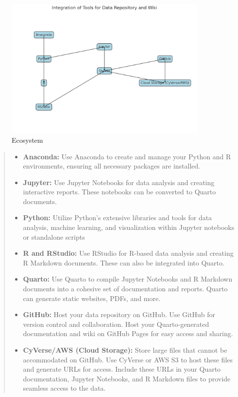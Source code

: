 \documentclass[
  letterpaper,
  DIV=11,
  numbers=noendperiod]{scrartcl}
\providecommand{\tightlist}{%
  \setlength{\itemsep}{0pt}\setlength{\parskip}{0pt}}\usepackage{longtable,booktabs,array}
\begin{document}
\begin{figure}[H]

{\centering \includegraphics[width=0.9\textwidth,height=\textheight]{ecosystem_simple.png}

}

\caption{Ecosystem}

\end{figure}%

\begin{quote}
\begin{itemize}
\tightlist
\item
  \textbf{Anaconda:} Use Anaconda to create and manage your Python and R
  environments, ensuring all necessary packages are installed.
\item
  \textbf{Jupyter:} Use Jupyter Notebooks for data analysis and creating
  interactive reports. These notebooks can be converted to Quarto
  documents.
\item
  \textbf{Python:} Utilize Python's extensive libraries and tools for
  data analysis, machine learning, and visualization within Jupyter
  notebooks or standalone scripts
\item
  \textbf{R and RStudio:} Use RStudio for R-based data analysis and
  creating R Markdown documents. These can also be integrated into
  Quarto.
\item
  \textbf{Quarto:} Use Quarto to compile Jupyter Notebooks and R
  Markdown documents into a cohesive set of documentation and reports.
  Quarto can generate static websites, PDFs, and more.
\item
  \textbf{GitHub:} Host your data repository on GitHub. Use GitHub for
  version control and collaboration. Host your Quarto-generated
  documentation and wiki on GitHub Pages for easy access and sharing.
\item
  \textbf{CyVerse/AWS (Cloud Storage):} Store large files that cannot be
  accommodated on GitHub. Use CyVerse or AWS S3 to host these files and
  generate URLs for access. Include these URLs in your Quarto
  documentation, Jupyter Notebooks, and R Markdown files to provide
  seamless access to the data.
\end{itemize}
\end{quote}
\end{document}
